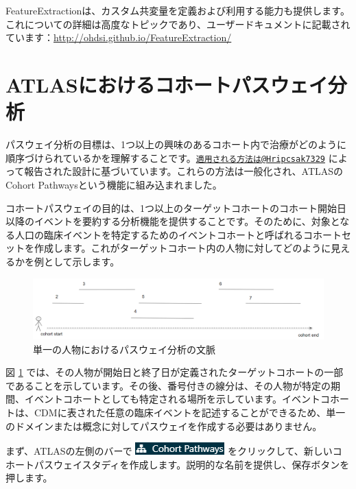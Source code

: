 \documentclass[
  11pt]{book}
\theoremstyle{definition}
\theoremstyle{definition}
\theoremstyle{definition}
\theoremstyle{definition}
\theoremstyle{remark}
\begin{document}
FeatureExtractionは、カスタム共変量を定義および利用する能力も提供します。これについての詳細は高度なトピックであり、ユーザードキュメントに記載されています：\url{http://ohdsi.github.io/FeatureExtraction/}

\section{ATLASにおけるコホートパスウェイ分析}\label{atlasux306bux304aux3051ux308bux30b3ux30dbux30fcux30c8ux30d1ux30b9ux30a6ux30a7ux30a4ux5206ux6790}

パスウェイ分析の目標は、1つ以上の興味のあるコホート内で治療がどのように順序づけられているかを理解することです。\href{mailto:適用される方法は@Hripcsak7329}{\nolinkurl{適用される方法は@Hripcsak7329}} によって報告された設計に基づいています。これらの方法は一般化され、ATLASのCohort Pathwaysという機能に組み込まれました。

コホートパスウェイの目的は、1つ以上のターゲットコホートのコホート開始日以降のイベントを要約する分析機能を提供することです。そのために、対象となる人口の臨床イベントを特定するためのイベントコホートと呼ばれるコホートセットを作成します。これがターゲットコホート内の人物に対してどのように見えるかを例として示します。

\begin{figure}

{\centering \includegraphics[width=1\linewidth]{images/Characterization/pathwaysPersonEventView} 

}

\caption{単一の人物におけるパスウェイ分析の文脈}\label{fig:pathwaysPersonEventView}
\end{figure}

図 \ref{fig:pathwaysPersonEventView} では、その人物が開始日と終了日が定義されたターゲットコホートの一部であることを示しています。その後、番号付きの線分は、その人物が特定の期間、イベントコホートとしても特定される場所を示しています。イベントコホートは、CDMに表された任意の臨床イベントを記述することができるため、単一のドメインまたは概念に対してパスウェイを作成する必要はありません。

まず、ATLASの左側のバーで \includegraphics{images/Characterization/atlasPathwaysMenuItem.png} をクリックして、新しいコホートパスウェイスタディを作成します。説明的な名前を提供し、保存ボタンを押します。
\end{document}
